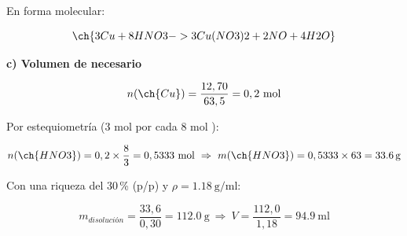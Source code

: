 \begin{exerciseEVAU}
\begin{solu}
        En forma molecular:

        \begin{equation*}
            \ch{3 Cu + 8 HNO3 -> 3 Cu(NO3)2 + 2 NO + 4 H2O}
        \end{equation*}

        \textbf{c) Volumen de  necesario}

        \begin{equation*}
            n(\ch{Cu}) = \dfrac{12,70}{63,5} = 0,2 \ \text{mol}
        \end{equation*}

        Por estequiometría (3 mol  por cada 8 mol ):

        \begin{equation*}
            n(\ch{HNO3}) = 0,2 \times \dfrac{8}{3} = 0,5333 \ \text{mol} \ \Rightarrow \ m(\ch{HNO3}) = 0,5333\times63 = \SI{33.6}{\gram}
        \end{equation*}

        Con una riqueza del 30\,\% (p/p) y \(\rho = \SI{1.18}{\gram\per\milli\litre}\):

        \begin{equation*}
            m_{disolución} = \dfrac{33,6}{0,30} = \SI{112.0}{\gram} \ \Rightarrow \ V = \dfrac{112,0}{1,18} = \SI{94.9}{\milli\litre}
        \end{equation*}

    \end{solu}
\end{exerciseEVAU}

